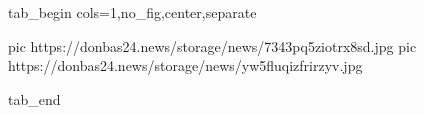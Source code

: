  
 
 
 
 



\ifcmt
  tab_begin cols=1,no_fig,center,separate

     pic https://donbas24.news/storage/news/7343pq5ziotrx8sd.jpg
		 pic https://donbas24.news/storage/news/yw5fluqizfrirzyv.jpg

  tab_end
\fi
